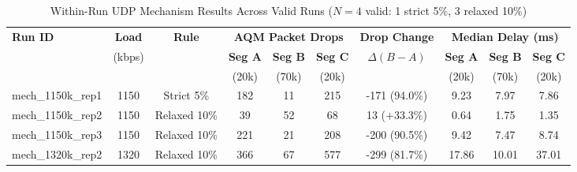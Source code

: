 \begin{table}[H]
\centering
\small
\caption{Within-Run UDP Mechanism Results Across Valid Runs ($N=4$ valid: 1 strict 5\%, 3 relaxed 10\%)}
\label{tab:udp_mechanism}
\begin{tabularx}{\textwidth}{lccccccccc}
\toprule
\textbf{Run ID} & \textbf{Load} & \textbf{Rule} & \multicolumn{3}{c}{\textbf{AQM Packet Drops}} & \textbf{Drop Change} & \multicolumn{3}{c}{\textbf{Median Delay (ms)}} \\
\cmidrule(lr){4-6} \cmidrule(lr){8-10}
 & (kbps) & & \textbf{Seg A} & \textbf{Seg B} & \textbf{Seg C} & $\Delta(B - A)$ & \textbf{Seg A} & \textbf{Seg B} & \textbf{Seg C} \\
 & & & (20k) & (70k) & (20k) & & (20k) & (70k) & (20k) \\
\midrule
mech\_1150k\_rep1 & 1150 & Strict 5\% & 182 & 11 & 215 & -171 (94.0\%) & 9.23 & 7.97 & 7.86 \\
mech\_1150k\_rep2 & 1150 & Relaxed 10\% & 39 & 52 & 68 & 13 (+33.3\%) & 0.64 & 1.75 & 1.35 \\
mech\_1150k\_rep3 & 1150 & Relaxed 10\% & 221 & 21 & 208 & -200 (90.5\%) & 9.42 & 7.47 & 8.74 \\
mech\_1320k\_rep2 & 1320 & Relaxed 10\% & 366 & 67 & 577 & -299 (81.7\%) & 17.86 & 10.01 & 37.01 \\
\bottomrule
\end{tabularx}
\end{table}
